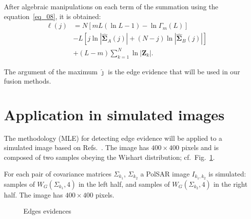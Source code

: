 \documentclass[conference]{IEEEtran}
\begin{document}
After algebraic manipulations on each term of the summation using the equation~\eqref{eq_08}, it is obtained:
\begin{align}\nonumber
	\ell(j)&=N\left[mL(\ln{L}-1)-\ln{\Gamma_m(L)}\right]\\\nonumber
	&- L\left[j\ln{|\mathbf{\widehat{\Sigma}}_{A}(j)|} +(N-j)\ln{|\mathbf{\widehat{\Sigma}}_{B}(j)|}\right] \\
	&+ (L-m)\sum_{k=1}^{N}\ln{|\mathbf{Z}_{k}|}.\label{eq_09}
\end{align}

The argument of the maximum $\widehat{\jmath}$ is the edge evidence that will be used in our fusion methods.

\section{Application in simulated images}\label{sec_06}

The methodology (MLE) for detecting edge evidence will be applied to a simulated image based on Refs.~\cite{nhfc,gamf}. 
The image has $400\times400$ pixels and is composed of two samples obeying the Wishart distribution; cf.\ Fig.~\ref{fig_Edges-Evidence}.

For each pair of covariance matrices $\Sigma_{k_1}$, $\Sigma_{k_2}$ a PolSAR image $I_{k_1,k_2}$ is simulated: 
samples of $W_G(\Sigma_{k_1}, 4)$ in the left half, and 
samples of $W_G(\Sigma_{k_2}, 4)$ in the right half.
The image has $400 \times 400$ pixels.

\begin{figure}[hbt]
    \caption{Edges evidences}
     \label{fig_Edges-Evidence}
\end{figure}
\end{document}
